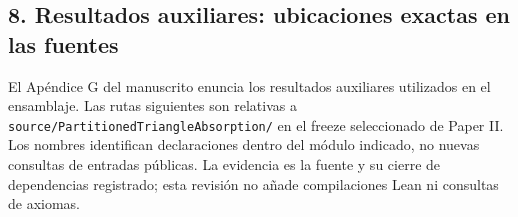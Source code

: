 \documentclass[spanish,11pt,a4paper]{article}
\begin{document}
\subsection{8. Resultados auxiliares: ubicaciones exactas en las fuentes}\label{resultados-auxiliares-ubicaciones-exactas-en-las-fuentes}

El Apéndice G del manuscrito enuncia los resultados auxiliares utilizados en el ensamblaje. Las rutas siguientes son relativas a \texttt{source/\allowbreak{}Parti\allowbreak{}tioned\allowbreak{}Triang\allowbreak{}le\allowbreak{}Absorption\allowbreak{}/\allowbreak{}} en el freeze seleccionado de Paper II. Los nombres identifican declaraciones dentro del módulo indicado, no nuevas consultas de entradas públicas. La evidencia es la fuente y su cierre de dependencias registrado; esta revisión no añade compilaciones Lean ni consultas de axiomas.
\end{document}
